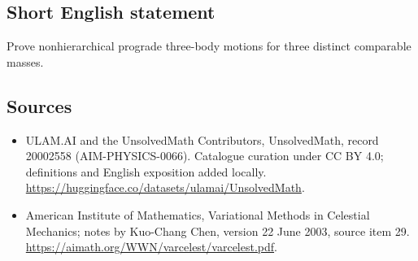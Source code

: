 \documentclass[11pt]{article}
\begin{document}
\subsection{Short English statement}
Prove nonhierarchical prograde three-body motions for three distinct comparable masses.
\subsection{Sources}
\begin{itemize}
\item[\hypertarget{source:20002558:1}{S1}] ULAM.AI and the UnsolvedMath Contributors, UnsolvedMath, record 20002558 (AIM-PHYSICS-0066). Catalogue curation under CC BY 4.0; definitions and English exposition added locally.
\url{https://huggingface.co/datasets/ulamai/UnsolvedMath}.
\item[\hypertarget{source:20002558:2}{S2}] American Institute of Mathematics, Variational Methods in Celestial Mechanics; notes by Kuo-Chang Chen, version 22 June 2003, source item 29.
\url{https://aimath.org/WWN/varcelest/varcelest.pdf}.
\end{itemize}
\label{end:20002558}
\end{document}
